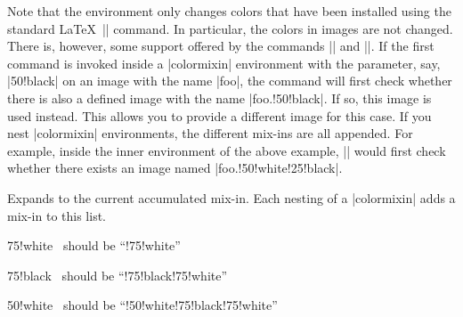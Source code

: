 Note that the environment only changes colors that have been installed
using the standard \LaTeX\ |\color| command. In particular,
the colors in images are not changed. There is, however, some support
offered by the commands |\pgfuseimage| and
|\pgfuseshading|. If the first command is invoked 
inside a |colormixin| environment with the parameter, say,
|50!black| on an image with the name |foo|, the command
will first check whether there is also a defined image with the name
|foo.!50!black|. If so, this image is used instead. This allows
you to provide a different image for this case. If you nest
|colormixin| environments, the different mix-ins are all appended. For
example, inside the inner environment of 
the above example, || would first check whether
there exists an image named |foo.!50!white!25!black|.

\begin{command}{}
  Expands to the current accumulated mix-in. Each nesting of a
  |colormixin| adds a mix-in to this list.
\begin{codeexample}[]
\begin{minipage}{\linewidth-6pt}\raggedright
\begin{colormixin}{75!white}
  \ should be ``!75!white''\par
  \begin{colormixin}{75!black}
    \ should be ``!75!black!75!white''\par
    \begin{colormixin}{50!white}
      \ should be ``!50!white!75!black!75!white''\par
    \end{colormixin}
  \end{colormixin}
\end{colormixin}
\end{minipage}
\end{codeexample}
\end{command}




